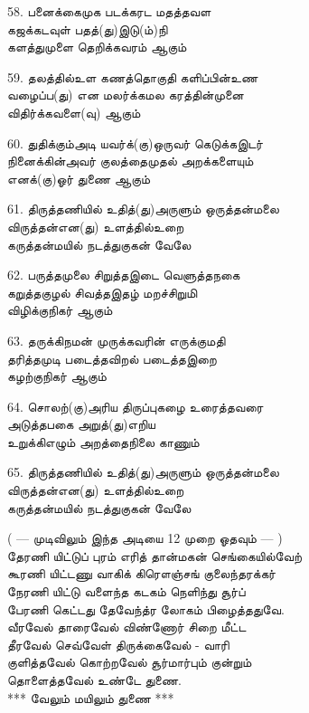 58. பனைக்கைமுக படக்கரட மதத்தவள\\
         கஜக்கடவுள் பதத்(து)இடு(ம்)நி\\
         களத்துமுளை தெறிக்கவரம் ஆகும் \thiru



59. தலத்தில்உள கணத்தொகுதி களிப்பின்உண\\
         வழைப்ப(து) என மலர்க்கமல கரத்தின்முனை\\
         விதிர்க்கவளை(வு) ஆகும் \thiru



60. துதிக்கும்அடி யவர்க்(கு)ஒருவர் கெடுக்கஇடர்\\
         நினைக்கின்அவர் குலத்தைமுதல் அறக்களையும்\\
         எனக்(கு)ஓர் துணை ஆகும் \thiru



61. திருத்தணியில் உதித்(து)அருளும் ஒருத்தன்மலை\\
        விருத்தன்என(து) உளத்தில்உறை\\
        கருத்தன்மயில் நடத்துகுகன் வேலே \thiru



62. பருத்தமுலை சிறுத்தஇடை வெளுத்தநகை\\
        கறுத்தகுழல் சிவத்தஇதழ் மறச்சிறுமி\\
        விழிக்குநிகர் ஆகும் \thiru



63. தருக்கிநமன் முருக்கவரின் எருக்குமதி\\
         தரித்தமுடி படைத்தவிறல் படைத்தஇறை\\
         கழற்குநிகர் ஆகும் \thiru



64. சொலற்(கு)அரிய திருப்புகழை உரைத்தவரை\\
         அடுத்தபகை அறுத்(து)எறிய\\
         உறுக்கிஎழும் அறத்தைநிலை காணும் \thiru



65. திருத்தணியில் உதித்(து)அருளும் ஒருத்தன்மலை\\
        விருத்தன்என(து) உளத்தில்உறை\\
        கருத்தன்மயில் நடத்துகுகன் வேலே \thiru



( --- முடிவிலும் இந்த அடியை 12 முறை ஓதவும் --- )\\[1em]



        தேரணி யிட்டுப் புரம் எரித் தான்மகன் செங்கையில்வேற்\\
        கூரணி யிட்டணு வாகிக் கிரௌஞ்சங் குலைந்தரக்கர்\\
        நேரணி யிட்டு வளைந்த கடகம் நெளிந்து சூர்ப்\\
        பேரணி கெட்டது தேவேந்த்ர லோகம் பிழைத்ததுவே.\\[1em]



        வீரவேல் தாரைவேல் விண்ணோர் சிறை மீட்ட\\
        தீரவேல் செவ்வேள் திருக்கைவேல் - வாரி\\
        குளித்தவேல் கொற்றவேல் சூர்மார்பும் குன்றும்\\
        தொளைத்தவேல் உண்டே துணை.\\[1em]



       *** வேலும் மயிலும் துணை ***\\

\endgroup